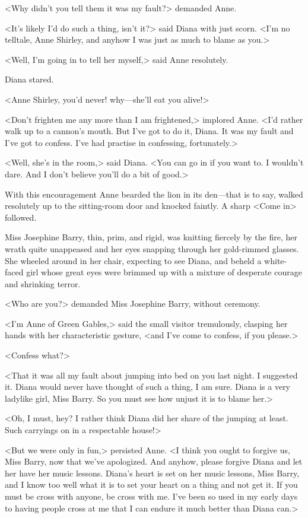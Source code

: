 <Why didn't you tell them it was my fault?> demanded Anne.

<It's likely I'd do such a thing, isn't it?> said Diana with just scorn. <I'm no telltale, Anne Shirley, and anyhow I was just as much to blame as you.>

<Well, I'm going in to tell her myself,> said Anne resolutely.

Diana stared.

<Anne Shirley, you'd never! why—she'll eat you alive!>

<Don't frighten me any more than I am frightened,> implored Anne. <I'd rather walk up to a cannon's mouth. But I've got to do it, Diana. It was my fault and I've got to confess. I've had practise in confessing, fortunately.>

<Well, she's in the room,> said Diana. <You can go in if you want to. I wouldn't dare. And I don't believe you'll do a bit of good.>

With this encouragement Anne bearded the lion in its den—that is to say, walked resolutely up to the sitting-room door and knocked faintly. A sharp <Come in> followed.

Miss Josephine Barry, thin, prim, and rigid, was knitting fiercely by the fire, her wrath quite unappeased and her eyes snapping through her gold-rimmed glasses. She wheeled around in her chair, expecting to see Diana, and beheld a white-faced girl whose great eyes were brimmed up with a mixture of desperate courage and shrinking terror.

<Who are you?> demanded Miss Josephine Barry, without ceremony.

<I'm Anne of Green Gables,> said the small visitor tremulously, clasping her hands with her characteristic gesture, <and I've come to confess, if you please.>

<Confess what?>

<That it was all my fault about jumping into bed on you last night. I suggested it. Diana would never have thought of such a thing, I am sure. Diana is a very ladylike girl, Miss Barry. So you must see how unjust it is to blame her.>

<Oh, I must, hey? I rather think Diana did her share of the jumping at least. Such carryings on in a respectable house!>

<But we were only in fun,> persisted Anne. <I think you ought to forgive us, Miss Barry, now that we've apologized. And anyhow, please forgive Diana and let her have her music lessons. Diana's heart is set on her music lessons, Miss Barry, and I know too well what it is to set your heart on a thing and not get it. If you must be cross with anyone, be cross with me. I've been so used in my early days to having people cross at me that I can endure it much better than Diana can.>

